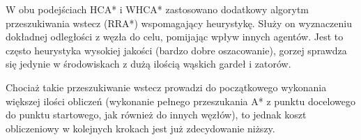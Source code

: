W obu podejściach HCA* i WHCA* zastosowano dodatkowy algorytm przeszukiwania wstecz (RRA*) wspomagający heurystykę. Służy on wyznaczeniu dokładnej odległości z węzła do celu, pomijając wpływ innych agentów. Jest to często heurystyka wysokiej jakości (bardzo dobre oszacowanie), gorzej sprawdza się jedynie w środowiskach z dużą ilością wąskich gardeł i zatorów. \cite{rtcooppathfinding}

Chociaż takie przeszukiwanie wstecz prowadzi do początkowego wykonania większej ilości obliczeń (wykonanie pełnego przeszukania A* z punktu docelowego do punktu startowego, jak również do innych węzłów), to jednak koszt obliczeniowy w kolejnych krokach jest już zdecydowanie niższy. \cite{rtcooppathfinding}
